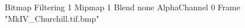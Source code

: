 {Bitmap
	{Filtering 1}
	{Mipmap 1}
	{Blend none}
	{AlphaChannel 0}
	{Frame "MkIV_Churchill.tif.bmp"}
}
